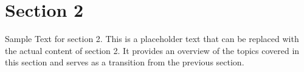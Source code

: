 \section{Section 2}

Sample Text for section 2. This is a placeholder text that can be replaced with the actual content of section 2. It provides an overview of the topics covered in this section and serves as a transition from the previous section.